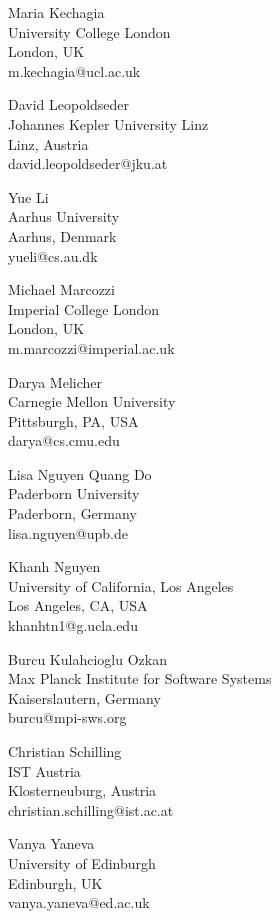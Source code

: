 \documentclass[a4paper,UKenglish]{dartsmaster-v2019}
\begin{document}
\begin{participants}
\participant Maria Kechagia\\
	University College London\\
	London, UK\\
	m.kechagia@ucl.ac.uk

\participant David Leopoldseder\\
	Johannes Kepler University Linz\\
	Linz, Austria\\
	david.leopoldseder@jku.at

\participant Yue Li\\
	Aarhus University\\
	Aarhus, Denmark\\
	yueli@cs.au.dk

\participant Michael Marcozzi\\
	Imperial College London\\
	London, UK\\
	m.marcozzi@imperial.ac.uk

\participant Darya Melicher\\
	Carnegie Mellon University\\
	Pittsburgh, PA, USA\\
	darya@cs.cmu.edu

\participant Lisa Nguyen Quang Do\\
	Paderborn University\\
	Paderborn, Germany\\
	lisa.nguyen@upb.de

\participant Khanh Nguyen\\
	University of California, Los Angeles\\
	Los Angeles, CA, USA\\
	khanhtn1@g.ucla.edu

\participant Burcu Kulahcioglu Ozkan\\
	Max Planck Institute for Software Systems\\
	Kaiserslautern, Germany\\
	burcu@mpi-sws.org

\participant Christian Schilling\\
	IST Austria\\
	Klosterneuburg, Austria\\
	christian.schilling@ist.ac.at

\participant Vanya Yaneva\\
	University of Edinburgh\\
	Edinburgh, UK\\
	vanya.yaneva@ed.ac.uk

\end{participants}
\end{document}
